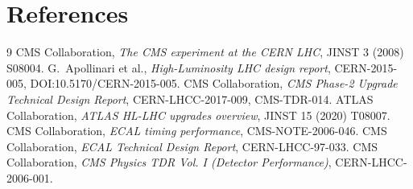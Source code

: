 \documentclass[12pt,a4paper]{article}
\begin{document}
\section*{References}
\begin{thebibliography}{9}
 CMS Collaboration, \textit{The CMS experiment at the CERN LHC}, JINST 3 (2008) S08004.
 G.~Apollinari et al., \textit{High-Luminosity LHC design report}, CERN-2015-005, DOI:10.5170/CERN-2015-005.
 CMS Collaboration, \textit{CMS Phase-2 Upgrade Technical Design Report}, CERN-LHCC-2017-009, CMS-TDR-014.
 ATLAS Collaboration, \textit{ATLAS HL-LHC upgrades overview}, JINST 15 (2020) T08007.
 CMS Collaboration, \textit{ECAL timing performance}, CMS-NOTE-2006-046.
 CMS Collaboration, \textit{ECAL Technical Design Report}, CERN-LHCC-97-033.
 CMS Collaboration, \textit{CMS Physics TDR Vol. I (Detector Performance)}, CERN-LHCC-2006-001.
\end{thebibliography}
\end{document}
